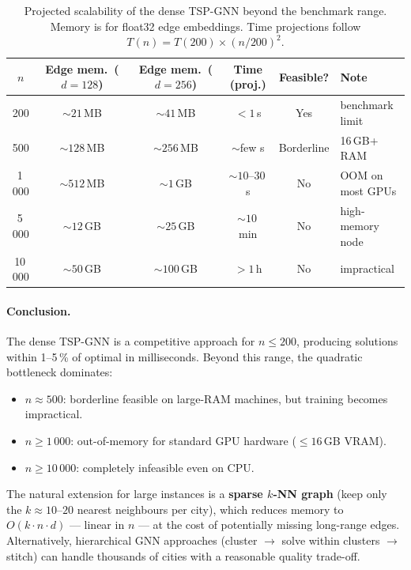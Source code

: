 \documentclass[12pt,a4paper]{article}
\begin{document}
\begin{table}[H]
\centering
{}
\begin{tabularx}{\linewidth}{cccccX}
\toprule
$n$ & Edge mem.\ ($d=128$) & Edge mem.\ ($d=256$) & Time (proj.) & Feasible? & Note \\
\midrule
200     & ${\sim}21$\,MB  & ${\sim}41$\,MB  & $<1$\,s       & Yes       & benchmark limit \\
500     & ${\sim}128$\,MB & ${\sim}256$\,MB & ${\sim}$few s & Borderline & 16\,GB+ RAM \\
1\,000  & ${\sim}512$\,MB & ${\sim}1$\,GB   & ${\sim}10$--30\,s & No   & OOM on most GPUs \\
5\,000  & ${\sim}12$\,GB  & ${\sim}25$\,GB  & ${\sim}10$\,min   & No   & high-memory node \\
10\,000 & ${\sim}50$\,GB  & ${\sim}100$\,GB & $>1$\,h           & No   & impractical \\
\bottomrule
\end{tabularx}
\caption{Projected scalability of the dense TSP-GNN beyond the benchmark range.
  Memory is for float32 edge embeddings.
  Time projections follow $T(n) = T(200) \times (n/200)^2$.}
\label{tab:scalability}
\end{table}

\paragraph{Conclusion.}
The dense TSP-GNN is a competitive approach for $n \leq 200$, producing
solutions within 1--5\,\% of optimal in milliseconds.
Beyond this range, the quadratic bottleneck dominates:

\begin{itemize}[leftmargin=1.5em]
  \item \textbf{$n \approx 500$}: borderline feasible on large-RAM machines,
    but training becomes impractical.
  \item \textbf{$n \geq 1\,000$}: out-of-memory for standard GPU hardware
    ($\leq 16$\,GB VRAM).
  \item \textbf{$n \geq 10\,000$}: completely infeasible even on CPU.
\end{itemize}

\noindent The natural extension for large instances is a \textbf{sparse $k$-NN graph}
(keep only the $k \approx 10$--$20$ nearest neighbours per city), which reduces
memory to $O(k \cdot n \cdot d)$ --- linear in $n$ --- at the cost of potentially
missing long-range edges.
Alternatively, hierarchical GNN approaches (cluster $\to$ solve within clusters
$\to$ stitch) can handle thousands of cities with a reasonable quality trade-off.
\end{document}
